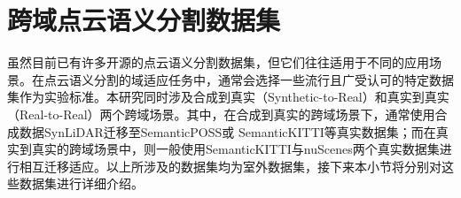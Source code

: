 \section{跨域点云语义分割数据集}
虽然目前已有许多开源的点云语义分割数据集，但它们往往适用于不同的应用场景。在点云语义分割的域适应任务中，通常会选择一些流行且广受认可的特定数据集作为实验标准。本研究同时涉及合成到真实（Synthetic-to-Real）和真实到真实（Real-to-Real）两个跨域场景。其中，在合成到真实的跨域场景下，通常使用合成数据SynLiDAR迁移至SemanticPOSS或 SemanticKITTI等真实数据集；而在真实到真实的跨域场景中，则一般使用SemanticKITTI与nuScenes两个真实数据集进行相互迁移适应。以上所涉及的数据集均为室外数据集，接下来本小节将分别对这些数据集进行详细介绍。
